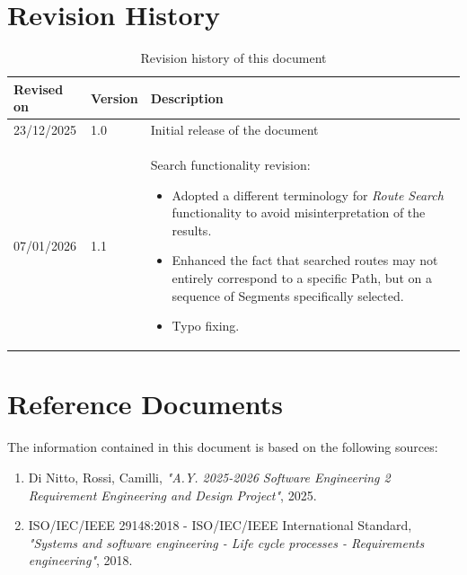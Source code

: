 \section{Revision History}
\begin{table}[H]
    \sf
    \small
    \centering
    \renewcommand{\arraystretch}{1.5}
    \begin{tabularx}{\textwidth}{|l|l|X|}
        \hline
        \rowcolor{lightgray} \textbf{Revised on} & \textbf{Version} & \textbf{Description}\\
        \hline
        23/12/2025 & 1.0 & Initial release of the document \\
        07/01/2026 & 1.1 & Search functionality revision:  
        \begin{itemize}
            \item Adopted a different terminology for \emph{Route Search} functionality to avoid misinterpretation of the results.
            \item Enhanced the fact that searched routes may not entirely correspond to a specific Path, but on a sequence of Segments specifically selected.
            \item Typo fixing.
        \end{itemize}
        \\
        \hline
    \end{tabularx}
    \caption{Revision history of this document}
\end{table}

\section{Reference Documents}
The information contained in this document is based on the following sources:
\begin{enumerate}[noitemsep]
    \item Di Nitto, Rossi, Camilli, \emph{"A.Y. 2025-2026 Software Engineering 2 Requirement Engineering and Design Project"}, 2025.
    \item ISO/IEC/IEEE 29148:2018 - ISO/IEC/IEEE International Standard, \emph{"Systems and software engineering - Life cycle processes - Requirements engineering"}, 2018.
\end{enumerate}

